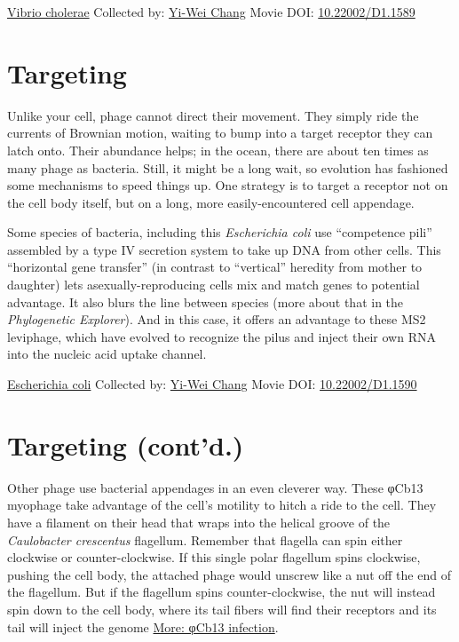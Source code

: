 \documentclass[]{tufte-book}
\begin{document}
\hypertarget{htmlwidget-570c2a3679e287bac9b0}{}

\label{fig:10-4}\protect\hyperlink{tree}{Vibrio cholerae} Collected by: \protect\hyperlink{yi-wei_chang}{Yi-Wei Chang} Movie DOI: \href{https://doi.org/10.22002/D1.1589}{10.22002/D1.1589}

\hypertarget{targeting}{%
\section{Targeting}\label{targeting}}

Unlike your cell, phage cannot direct their movement. They simply ride the currents of Brownian motion, waiting to bump into a target receptor they can latch onto. Their abundance helps; in the ocean, there are about ten times as many phage as bacteria. Still, it might be a long wait, so evolution has fashioned some mechanisms to speed things up. One strategy is to target a receptor not on the cell body itself, but on a long, more easily-encountered cell appendage.

Some species of bacteria, including this \emph{Escherichia coli} use ``competence pili'' assembled by a type IV secretion system to take up DNA from other cells. This ``horizontal gene transfer'' (in contrast to ``vertical'' heredity from mother to daughter) lets asexually-reproducing cells mix and match genes to potential advantage. It also blurs the line between species (more about that in the \emph{Phylogenetic Explorer}). And in this case, it offers an advantage to these MS2 leviphage, which have evolved to recognize the pilus and inject their own RNA into the nucleic acid uptake channel.



\hypertarget{htmlwidget-5a4883db7a273c871918}{}

\label{fig:10-5}\protect\hyperlink{tree}{Escherichia coli} Collected by: \protect\hyperlink{yi-wei_chang}{Yi-Wei Chang} Movie DOI: \href{https://doi.org/10.22002/D1.1590}{10.22002/D1.1590}

\hypertarget{targeting-contd.}{%
\section{Targeting (cont'd.)}\label{targeting-contd.}}

Other phage use bacterial appendages in an even cleverer way. These φCb13 myophage take advantage of the cell's motility to hitch a ride to the cell. They have a filament on their head that wraps into the helical groove of the \emph{Caulobacter crescentus} flagellum. Remember that flagella can spin either clockwise or counter-clockwise. If this single polar flagellum spins clockwise, pushing the cell body, the attached phage would unscrew like a nut off the end of the flagellum. But if the flagellum spins counter-clockwise, the nut will instead spin down to the cell body, where its tail fibers will find their receptors and its tail will inject the genome \protect\hyperlink{ux3c6Cb13_infection}{More: φCb13 infection}.
\end{document}
